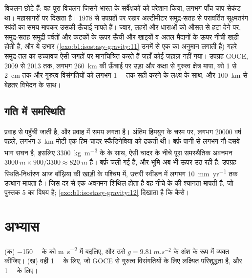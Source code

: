 विचलन छोटे हैं: वह पूरा विचलन जिसने भारत के सर्वेक्षकों को परेशान किया, लगभग पाँच चाप-सेकंड था। महासागरों पर  दिखता है। 1978 से उपग्रहों पर रडार अल्टीमीटर समुद्र-सतह से परावर्तित सूक्ष्मतरंग स्पंदों का समय मापकर उसकी ऊँचाई नापते हैं। ज्वार, लहरों और धाराओं को औसत से हटा देने पर, समुद्र-सतह समुद्री पर्वतों और कटकों के ऊपर ऊँची और खाइयों व अतल मैदानों के ऊपर नीची खड़ी होती है, और ये उभार (\cref{exo:b1:isostasy-gravity:11} उनमें से एक का अनुमान लगाती है) गहरे समुद्र-तल का उच्चावच ऐसी जगहों पर मानचित्रित करते हैं जहाँ कोई जहाज़ नहीं गया। उपग्रह GOCE, 2009 से 2013 तक, लगभग \qty{260}{km} की ऊँचाई पर उड़ा और कक्षा से गुरुत्व क्षेत्र मापा,  को 1 से \qty{2}{cm} तक और गुरुत्व विसंगतियों को लगभग \qty{1}{\milli\gal} तक सही करने के लक्ष्य के साथ, और \qty{100}{km} से बेहतर विभेदन के साथ।

\subsection*{गति में समस्थिति}

 प्रवाह से पहुँची जाती है, और प्रवाह में समय लगता है। अंतिम हिमयुग के चरम पर, लगभग \num{20000} वर्ष पहले, लगभग \qty{3}{km} मोटी एक हिम-चादर स्कैंडिनेविया को ढकती थी। बर्फ़ पानी से लगभग नौ-दसवें भाग सघन है, इसलिए \qty{3300}{kg.m^{-3}} के  के साथ, ऐसी चादर के नीचे पूरा समस्थैतिक अवनमन $\qty{3000}{m}\times900/3300 \approx \qty{820}{m}$ है। बर्फ़ चली गई है, और भूमि अब भी ऊपर उठ रही है: उपग्रह स्थिति-निर्धारण आज बॉथ्निया की खाड़ी के पश्चिम में, उत्तरी स्वीडन में लगभग \qty{10}{mm.yr^{-1}} तक उत्थान मापता है। जिस दर से एक अवनमन शिथिल होता है वह नीचे के  की श्यानता मापती है, जो पुस्तक 5 का विषय है; \cref{exo:b1:isostasy-gravity:12} दिखाता है कि कैसे।

\section{अभ्यास}

\begin{exercise}[$\star$]\label{exo:b1:isostasy-gravity:1}
  (क) \qty{-150}{\milli\gal} के  को \unit{m.s^{-2}} में बदलिए, और उसे $g = \qty{9.81}{m.s^{-2}}$ के अंश के रूप में व्यक्त कीजिए। (ख) वही \qty{1}{\milli\gal} के लिए, जो GOCE से गुरुत्व विसंगतियों के लिए लक्ष्यित परिशुद्धता है, और \qty{1}{\micro\gal} के लिए।
\end{exercise}

